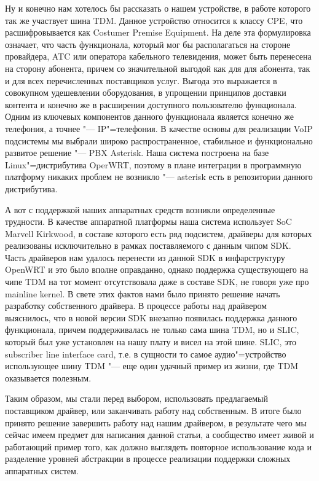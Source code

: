 \documentclass[10pt, a5paper]{article}
\begin{document}
Ну и конечно нам хотелось бы рассказать о нашем устройстве, в работе
которого так же участвует шина TDM. Данное устройство относится к классу
CPE, что расшифровывается как Costumer Premise Equipment. На деле эта
формулировка означает, что часть функционала, который мог бы располагаться
на стороне провайдера, ATC или оператора кабельного телевидения, может
быть перенесена на сторону абонента, причем со значительной выгодой как
для для абонента, так и для всех перечисленных поставщиков услуг. Выгода
это выражается в совокупном удешевлении оборудования, в упрощении
принципов доставки контента и конечно же в расширении доступного
пользователю функционала. Одним из ключевых компонентов данного
функционала является конечно же телефония, а точнее "--- IP"=телефония. В
качестве основы для реализации VoIP подсистемы мы выбрали широко
распространенное, стабильное и функционально развитое решение "--- PBX
Asterisk. Наша система построена на базе Linux"=дистрибутива OperWRT,
поэтому в плане интеграции в программную платформу никаких проблем не
возникло "--- asterisk есть в репозитории данного дистрибутива.

А вот с поддержкой наших аппаратных средств возникли определенные
трудности. В качестве аппаратной платформы наша система использует SoC
Marvell Kirkwood, в составе которого есть ряд подсистем, драйверы для
которых реализованы исключительно в рамках поставляемого с данным чипом
SDK. Часть драйверов нам удалось перенести из данной SDK в инфарструктуру
OpenWRT и это было вполне оправданно, однако поддержка существующего на
чипе TDM на тот момент отсутствовала даже в составе SDK, не говоря уже про
mainline kernel. В свете этих фактов нами было принято решение начать
разработку собственного драйвера. В процессе работы над драйвером
выяснилось, что в новой версии SDK внезапно появилась поддержка данного
функционала, причем поддерживалась не только сама шина TDM, но и SLIC,
который был уже установлен на нашу плату и висел на этой шине. SLIC, это
subscriber line interface card, т.е. в сущности то самое аудио"=устройство
использующее шину TDM "--- еще один удачный пример из жизни, где TDM
оказывается полезным.

Таким образом, мы стали перед выбором, использовать предлагаемый
поставщиком драйвер, или заканчивать работу над собственным. В итоге было
принято решение завершить работу над нашим драйвером, в результате чего мы
сейчас имеем предмет для написания данной статьи, а сообщество имеет живой
и работающий пример того, как должно выглядеть повторное использование
кода и разделение уровней абстракции в процессе реализации поддержки
сложных аппаратных систем.
\end{document}
